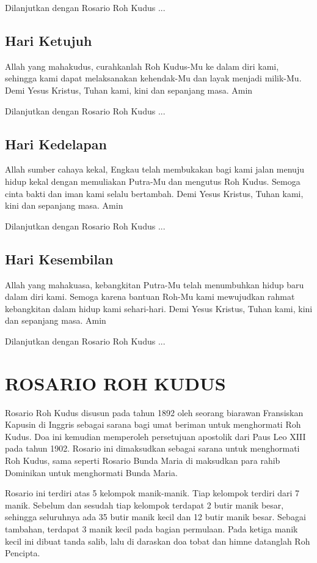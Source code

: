 \documentclass{article}
\begin{document}
Dilanjutkan dengan Rosario Roh Kudus ...

\subsection[Hari Ketujuh]{Hari Ketujuh}
Allah yang mahakudus, curahkanlah Roh Kudus-Mu ke dalam diri kami,
sehingga kami dapat melaksanakan kehendak-Mu dan layak menjadi
milik-Mu. Demi Yesus Kristus, Tuhan kami, kini dan sepanjang masa. Amin

Dilanjutkan dengan Rosario Roh Kudus ...

\subsection[Hari Kedelapan]{Hari Kedelapan}
Allah sumber cahaya kekal, Engkau telah membukakan bagi kami jalan
menuju hidup kekal dengan memuliakan Putra-Mu dan mengutus Roh Kudus.
Semoga cinta bakti dan iman kami selalu bertambah. Demi Yesus Kristus,
Tuhan kami, kini dan sepanjang masa. Amin

Dilanjutkan dengan Rosario Roh Kudus ...

\subsection[Hari Kesembilan]{Hari Kesembilan}
Allah yang mahakuasa, kebangkitan Putra-Mu telah menumbuhkan hidup baru
dalam diri kami. Semoga karena bantuan Roh-Mu kami mewujudkan rahmat
kebangkitan dalam hidup kami sehari-hari. Demi Yesus Kristus, Tuhan
kami, kini dan sepanjang masa. Amin

Dilanjutkan dengan Rosario Roh Kudus ...

\section[ROSARIO ROH KUDUS]{ROSARIO ROH KUDUS}
Rosario Roh Kudus disusun pada tahun 1892 oleh seorang biarawan
Fransiskan Kapusin di Inggris sebagai sarana bagi umat beriman untuk
menghormati Roh Kudus. Doa ini kemudian memperoleh persetujuan
apostolik dari Paus Leo XIII pada tahun 1902. Rosario ini dimaksudkan
sebagai sarana untuk menghormati Roh Kudus, sama seperti Rosario Bunda
Maria di maksudkan para rahib Dominikan untuk menghormati Bunda Maria.

Rosario ini terdiri atas 5 kelompok manik-manik. Tiap kelompok terdiri
dari 7 manik. Sebelum dan sesudah tiap kelompok terdapat 2 butir manik
besar, sehingga seluruhnya ada 35 butir manik kecil dan 12 butir manik
besar. Sebagai tambahan, terdapat 3 manik kecil pada bagian permulaan.
Pada ketiga manik kecil ini dibuat tanda salib, lalu di daraskan doa
tobat dan himne datanglah Roh Pencipta.
\end{document}
